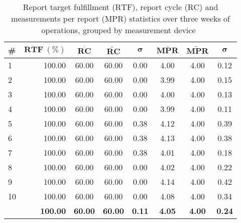 \begin{appendices}

\FloatBarrier
\newpage

\begin{table}[hbt]
	\centering
  	\begin{tabularx}{\textwidth}{|X|r|c|c|c|c|c|c|}
		\hline
		\textbf{\#}  & $\textbf{RTF}~(\%)$ & $\overline{\textbf{RC}}$ & $\widetilde{\textbf{RC}}$ & $\boldsymbol{\sigma}$ & $\overline{\textbf{MPR}}$ & $\widetilde{\textbf{MPR}}$ & $\boldsymbol{\sigma}$ \\
	    	\hline
	    1 	& 100.00 	& 60.00 & 60.00 & 0.00 & 4.00 & 4.00 & 0.12 \\ %
	    	\hline
	    	2 	& 100.00	& 60.00 & 60.00 & 0.00 & 3.99 & 4.00 & 0.15 \\ %
	    	\hline
	    	3 	& 100.00 	& 60.00 & 60.00 & 0.00 & 4.00 & 4.00 & 0.13 \\ %
	    \hline
	    	4 	& 100.00 	& 60.00 & 60.00 & 0.00 & 3.99 & 4.00 & 0.11 \\ %
	    	\hline
	    5 	& 100.00	& 60.00 & 60.00 & 0.38 & 4.12 & 4.00 & 0.39 \\ %
	    	6 	& 100.00 	& 60.00 & 60.00 & 0.38 & 4.13 & 4.00 & 0.38 \\ %
	    	\hline
	    7 	& 100.00	& 60.00 & 60.00 & 0.38 & 4.01 & 4.00 & 0.18 \\ %
	    \hline
	    	8 	& 100.00 	& 60.00 & 60.00 & 0.00 & 4.02 & 4.00 & 0.22 \\ %
	    	\hline
	    9 	& 100.00 	& 60.00 & 60.00 & 0.00 & 4.14 & 4.00 & 0.42 \\ %
	    	10 	& 100.00 	& 60.00 & 60.00 & 0.00 & 4.08 & 4.00 & 0.34 \\ %
	    	\hline
	    	\hline
	    	& \textbf{100.00} & \textbf{60.00} & \textbf{60.00} & \textbf{0.11} & \textbf{4.05} & \textbf{4.00} & \textbf{0.24} \\
	    	\hline
	\end{tabularx}
  	\caption[Report statistics, grouped by measurement device]{Report target fulfillment ($\text{RTF}$), report cycle ($\text{RC}$) and measurements per report ($\text{MPR}$) statistics over three weeks of operations, grouped by measurement device~\footnotemark}
  	\label{tab:report-cycle-statistics}
\end{table}


\end{appendices}
